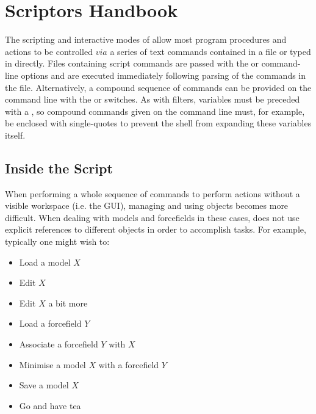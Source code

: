 \chapter{Scriptors Handbook}

The scripting and interactive modes of \progname{} allow most program procedures and actions to be controlled $via$ a series of text commands contained in a file or typed in directly. Files containing script commands are passed with the  or  command-line options and are executed immediately following parsing of the commands in the file. Alternatively, a compound sequence of commands can be provided on the command line with the  or  switches. As with filters, variables must be preceded with a \qte{\$}, so compound commands given on the command line must, for example, be enclosed with single-quotes to prevent the shell from expanding these variables itself.


\section{Inside the Script}
When performing a whole sequence of commands to perform actions without a visible workspace (i.e. the GUI), managing and using objects becomes more difficult. When dealing with models and forcefields in these cases, \progname{} does not use explicit references to different objects in order to accomplish tasks. For example, typically one might wish to:

\begin{itemize}
	\item Load a model $X$
	\item Edit $X$
	\item Edit $X$ a bit more
	\item Load a forcefield $Y$
	\item Associate a forcefield $Y$ with $X$
	\item Minimise a model $X$ with a forcefield $Y$
	\item Save a model $X$
	\item Go and have tea
\end{itemize}

